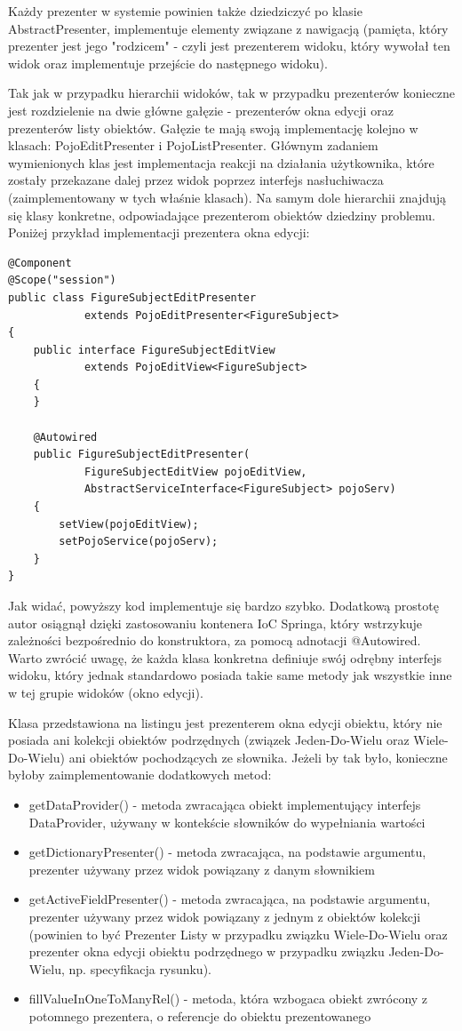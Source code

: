 \newpage
Każdy prezenter w systemie powinien także dziedziczyć po klasie AbstractPresenter, implementuje elementy związane z nawigacją (pamięta, który prezenter jest jego "rodzicem" - czyli jest prezenterem widoku, który wywołał ten widok oraz implementuje przejście do następnego widoku).

Tak jak w przypadku hierarchii widoków, tak w przypadku prezenterów konieczne jest rozdzielenie na dwie główne gałęzie - prezenterów okna edycji oraz prezenterów listy obiektów. Gałęzie te mają swoją implementację kolejno w klasach: PojoEditPresenter i PojoListPresenter. Głównym zadaniem wymienionych klas jest implementacja reakcji na działania użytkownika, które zostały przekazane dalej przez widok poprzez interfejs nasłuchiwacza (zaimplementowany w tych właśnie klasach). Na samym dole hierarchii znajdują się klasy konkretne, odpowiadające prezenterom obiektów dziedziny problemu. Poniżej przykład implementacji prezentera okna edycji:
\begin{lstlisting}
@Component
@Scope("session")
public class FigureSubjectEditPresenter 
			extends PojoEditPresenter<FigureSubject>
{
	public interface FigureSubjectEditView 
			extends PojoEditView<FigureSubject>
	{
	}

	@Autowired
	public FigureSubjectEditPresenter(
			FigureSubjectEditView pojoEditView, 
			AbstractServiceInterface<FigureSubject> pojoServ)
	{
		setView(pojoEditView);
		setPojoService(pojoServ);
	}
}
\end{lstlisting}

Jak widać, powyższy kod implementuje się bardzo szybko. Dodatkową prostotę autor osiągnął dzięki zastosowaniu kontenera IoC Springa, który wstrzykuje zależności bezpośrednio do konstruktora, za pomocą adnotacji @Autowired. Warto zwrócić uwagę, że każda klasa konkretna definiuje swój odrębny interfejs widoku, który jednak standardowo posiada takie same metody jak wszystkie inne w tej grupie widoków (okno edycji).

\newpage
Klasa przedstawiona na listingu jest prezenterem okna edycji obiektu, który nie posiada ani kolekcji obiektów podrzędnych (związek Jeden-Do-Wielu oraz Wiele-Do-Wielu) ani obiektów pochodzących ze słownika. Jeżeli by tak było, konieczne byłoby zaimplementowanie dodatkowych metod:
\begin{itemize}
\item getDataProvider() - metoda zwracająca obiekt implementujący interfejs DataProvider, używany w kontekście słowników do wypełniania wartości
\item getDictionaryPresenter() - metoda zwracająca, na podstawie argumentu, prezenter używany przez widok powiązany z danym słownikiem
\item getActiveFieldPresenter() - metoda zwracająca, na podstawie argumentu, prezenter używany przez widok powiązany z jednym z obiektów kolekcji (powinien to być Prezenter Listy w przypadku związku Wiele-Do-Wielu oraz prezenter okna edycji obiektu podrzędnego w przypadku związku Jeden-Do-Wielu, np. specyfikacja rysunku).
\item fillValueInOneToManyRel() - metoda, która wzbogaca obiekt zwrócony z potomnego prezentera, o referencje do obiektu prezentowanego
\end{itemize}

